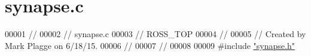 \hypertarget{synapse_8c_source}{}\section{synapse.\+c}
\label{synapse_8c_source}

\begin{DoxyCode}
00001 \textcolor{comment}{//}
00002 \textcolor{comment}{//  synapse.c}
00003 \textcolor{comment}{//  ROSS\_TOP}
00004 \textcolor{comment}{//}
00005 \textcolor{comment}{//  Created by Mark Plagge on 6/18/15.}
00006 \textcolor{comment}{//}
00007 \textcolor{comment}{//}
00008 
00009 \textcolor{preprocessor}{#}\textcolor{preprocessor}{include} \hyperlink{synapse_8h}{"synapse.h"}
\end{DoxyCode}

